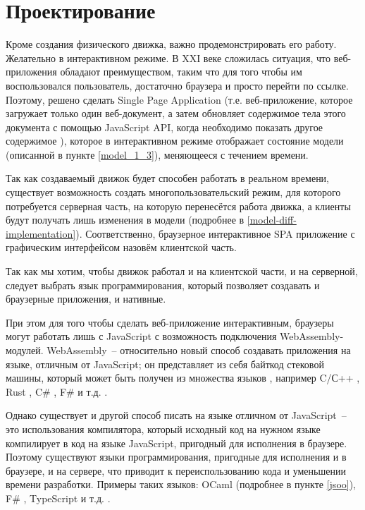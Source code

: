 \chapter{Проектирование}

Кроме создания физического движка, важно продемонстрировать его работу.
Желательно в интерактивном режиме. В XXI веке сложилась ситуация, что веб-приложения
обладают преимуществом, таким что для того чтобы им воспользовался пользователь, достаточно
браузера и просто перейти по ссылке.
Поэтому, решено сделать Single Page Application
(т.е. веб-приложение, которое загружает только один веб-документ,
а затем обновляет содержимое тела этого документа с помощью JavaScript API,
когда необходимо показать другое содержимое \cite{mdn-spa}),
которое в интерактивном режиме отображает состояние модели (описанной в пункте \ref{model_1_3}),
меняющееся с течением времени.

Так как создаваемый движок будет способен работать в реальном времени, существует возможность
создать многопользовательский режим, для которого потребуется серверная часть,
на которую перенесётся работа движка, а клиенты будут получать лишь изменения в модели (подробнее в \ref{model-diff-implementation}).
Соответственно, браузерное интерактивное SPA приложение с графическим интерфейсом назовём клиентской часть.

Так как мы хотим, чтобы движок работал и на клиентской части, и на серверной, следует выбрать язык программирования,
который позволяет создавать и браузерные приложения, и нативные.

При этом для того чтобы сделать веб-приложение интерактивным, браузеры могут работать лишь с JavaScript
с возможность подключения WebAssembly-модулей. WebAssembly~-- относительно новый способ создавать
приложения на языке, отличным от JavaScript; он представляет из себя байткод стековой машины,
который может быть получен из множества языков \cite{wasm}, например
C/С++ \cite{emscripten-about}, Rust \cite{rust-wasm}, C\# \cite{blazor-ru}, F\# \cite{fsbolero} и т.д. \cite{wasm-iwantto}.

Однако существует и другой способ
писать на языке отличном от JavaScript~-- это использования компилятора, который исходный код на нужном языке
компилирует в код на языке JavaScript, пригодный для исполнения в браузере. Поэтому существуют языки программирования,
пригодные для исполнения и в браузере, и на сервере, что приводит к переиспользованию кода и уменьшении времени разработки.
Примеры таких языков: OCaml (подробнее в пункте \ref{jsoo}), F\# \cite[с.~48]{dsyme-hopl}, TypeScript и т.д. \cite{typescript-mayorov}.

